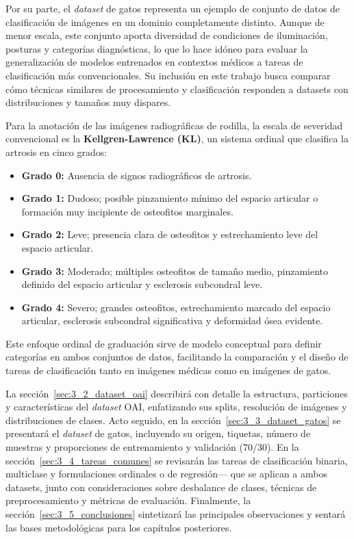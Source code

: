 \documentclass[11pt,spanish,listoffigures,listoftables]{tfgetsinf}
\begin{document}
Por su parte, el \emph{dataset} de gatos representa un ejemplo de conjunto de datos de clasificación de imágenes en un dominio completamente distinto. Aunque de menor 
escala, este conjunto aporta diversidad de condiciones de iluminación, posturas y categorías diagnósticas, lo que lo hace idóneo para evaluar la generalización 
de modelos entrenados en contextos médicos a tareas de clasificación más convencionales. Su inclusión en este trabajo busca comparar cómo técnicas similares 
de procesamiento y clasificación responden a datasets con distribuciones y tamaños muy dispares.

Para la anotación de las imágenes radiográficas de rodilla, la escala de severidad convencional es la \textbf{Kellgren-Lawrence (KL)}, un sistema ordinal que clasifica 
la artrosis en cinco grados:
\begin{itemize}
    \item \textbf{Grado 0:} Ausencia de signos radiográficos de artrosis.  
    \item \textbf{Grado 1:} Dudoso; posible pinzamiento mínimo del espacio articular o formación muy incipiente de osteofitos marginales.  
    \item \textbf{Grado 2:} Leve; presencia clara de osteofitos y estrechamiento leve del espacio articular.  
    \item \textbf{Grado 3:} Moderado; múltiples osteofitos de tamaño medio, pinzamiento definido del espacio articular y esclerosis subcondral leve.  
    \item \textbf{Grado 4:} Severo; grandes osteofitos, estrechamiento marcado del espacio articular, esclerosis subcondral significativa y deformidad ósea evidente.  
\end{itemize}
Este enfoque ordinal de graduación sirve de modelo conceptual para definir categorías en ambos conjuntos de datos, facilitando la comparación y el diseño de tareas 
de clasificación tanto en imágenes médicas como en imágenes de gatos.

La sección~\ref{sec:3_2_dataset_oai} describirá con detalle la estructura, particiones y características del \emph{dataset} OAI, enfatizando sus splits, resolución 
de imágenes y distribuciones de clases. Acto seguido, en la sección~\ref{sec:3_3_dataset_gatos} se presentará el \emph{dataset} de gatos, incluyendo su origen, 
tiquetas, número de muestras y proporciones de entrenamiento y validación (70/30). En la sección~\ref{sec:3_4_tareas_comunes} se revisarán las tareas de clasificación 
binaria, multiclase y formulaciones ordinales o de regresión— que se aplican a ambos datasets, junto con consideraciones sobre desbalance de clases, técnicas de 
preprocesamiento y métricas de evaluación. Finalmente, la sección~\ref{sec:3_5_conclusiones} sintetizará las principales observaciones y sentará las bases metodológicas 
para los capítulos posteriores.
\end{document}
